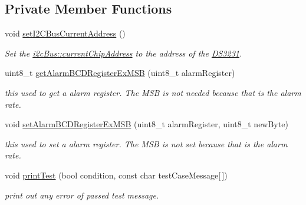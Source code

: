 \subsection*{Private Member Functions}
\begin{DoxyCompactItemize}
\item 
void \mbox{\hyperlink{class_d_s3231_ae6ef1547a0d2c2653ae3fe4c0f6a62ff}{set\+I2\+C\+Bus\+Current\+Address}} ()
\begin{DoxyCompactList}\small\item\em Set the \mbox{\hyperlink{classi2c_bus_a64ff87527c88619d72ede947d73eac3a}{i2c\+Bus\+::current\+Chip\+Address}} to the address of the \mbox{\hyperlink{class_d_s3231}{D\+S3231}}. \end{DoxyCompactList}\item 
uint8\+\_\+t \mbox{\hyperlink{class_d_s3231_a70033a61ca1965fa0aed9af31679355f}{get\+Alarm\+B\+C\+D\+Register\+Ex\+M\+SB}} (uint8\+\_\+t alarm\+Register)
\begin{DoxyCompactList}\small\item\em this used to get a alarm register. The M\+SB is not needed because that is the alarm rate. \end{DoxyCompactList}\item 
void \mbox{\hyperlink{class_d_s3231_a79280f7161eaa45b50fe649eda9c480a}{set\+Alarm\+B\+C\+D\+Register\+Ex\+M\+SB}} (uint8\+\_\+t alarm\+Register, uint8\+\_\+t new\+Byte)
\begin{DoxyCompactList}\small\item\em this used to set a alarm register. The M\+SB is not set because that is the alarm rate. \end{DoxyCompactList}\item 
void \mbox{\hyperlink{class_d_s3231_a8cbc8aa68345b7d2b5a2a0615d207932}{print\+Test}} (bool condition, const char test\+Case\+Message\mbox{[}$\,$\mbox{]})
\begin{DoxyCompactList}\small\item\em print out any error of passed test message. \end{DoxyCompactList}\end{DoxyCompactItemize}
